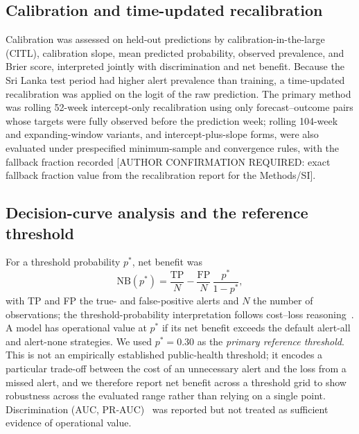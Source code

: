 \documentclass[11pt,a4paper]{article}
\begin{document}
\subsection{Calibration and time-updated recalibration}
Calibration was assessed on held-out predictions by calibration-in-the-large (CITL), calibration slope, mean predicted probability, observed prevalence, and Brier score, interpreted jointly with discrimination and net benefit. Because the Sri Lanka test period had higher alert prevalence than training, a time-updated recalibration was applied on the logit of the raw prediction. The primary method was rolling 52-week intercept-only recalibration using only forecast--outcome pairs whose targets were fully observed before the prediction week; rolling 104-week and expanding-window variants, and intercept-plus-slope forms, were also evaluated under prespecified minimum-sample and convergence rules, with the fallback fraction recorded [AUTHOR CONFIRMATION REQUIRED: exact fallback fraction value from the recalibration report for the Methods/SI].

\subsection{Decision-curve analysis and the reference threshold}
For a threshold probability $p^*$, net benefit was
\[
\mathrm{NB}(p^*)=\frac{\mathrm{TP}}{N}-\frac{\mathrm{FP}}{N}\,\frac{p^*}{1-p^*},
\]
with TP and FP the true- and false-positive alerts and $N$ the number of observations; the threshold-probability interpretation follows cost--loss reasoning~\cite{Vickers2006,Murphy1985,Tozan2023}. A model has operational value at $p^*$ if its net benefit exceeds the default alert-all and alert-none strategies. We used $p^*=0.30$ as the \emph{primary reference threshold}. This is not an empirically established public-health threshold; it encodes a particular trade-off between the cost of an unnecessary alert and the loss from a missed alert, and we therefore report net benefit across a threshold grid to show robustness across the evaluated range rather than relying on a single point. Discrimination (AUC, PR-AUC)~\cite{SaitoRehmsmeier2015} was reported but not treated as sufficient evidence of operational value.
\end{document}
